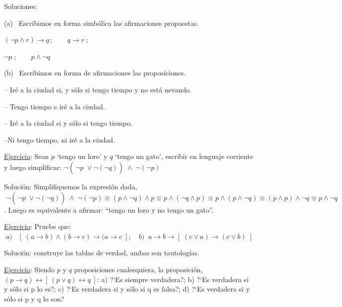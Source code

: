 \textcolor{gris}{ Soluciones:}

\begin{multicols}{2}
\textcolor{gris}{(a)  Escribimos en forma simbólica las afirmaciones propuestas.}

\textcolor{gris}{$ (\neg p \wedge r) \to q \, ; \qquad   q \to  r \; ;$}

\textcolor{gris}{$  \neg p \; ; \qquad     p \wedge \neg q $}

\textcolor{gris}{(b)  Escribimos en forma de afirmaciones las proposiciones.} 

\textcolor{gris}{-- Iré a la ciudad si, y sólo si tengo tiempo y no está nevando.}

\textcolor{gris}{-- Tengo tiempo e iré a la ciudad.}       

\textcolor{gris}{-- Iré a la ciudad si y sólo si tengo tiempo.}       

\textcolor{gris}{--Ni tengo tiempo, ni iré a la ciudad.} 
\end{multicols}

\underline{Ejercicio}:  Sean $p$ `tengo un loro' y $q$ `tengo un gato', escribir en lenguaje corriente y luego simplificar:
$\displaystyle \neg \left( \dfrac {}{} \neg p \; \vee \neg (\neg q) \right) \; \wedge \; \neg (\neg p) $



\textcolor{gris}{Solución:  Simplifiquemos la expresión dada, 
$\; \displaystyle \neg \left( \dfrac {}{} \neg p \; \vee \neg (\neg q) \right) \; \wedge \; \neg (\neg p) \equiv (p \wedge \neg q) \wedge p \equiv p \wedge (\neg q \wedge p ) \equiv p \wedge (p \wedge \neg q) \equiv (p \wedge p) \wedge \neg q \equiv p \wedge \neg q\; $.  
Luego es equivalente a afirmar: ``tengo un loro y no tengo un gato''.} 

\underline{Ejercicio}:  Pruebe que:
$\; a)\; \;  \; \left[ \; (a \to b) \wedge (b \to c) \to (a \to c \; \right]  ; \quad    b)\; \; a \to b \to  \left[ \; (c \vee a) \to (c \vee b) \; \right]   $

\textcolor{gris}{Solución: construye las tablas de verdad, ambas son tautologías.}

\underline{Ejercicio}:   
Siendo $p$ y $q$ proposiciones cualesquiera, la proposición, $(p \to q)  \leftrightarrow \left[ \, (p \vee q) \leftrightarrow q  \; \right] $:  a) ?`Es siempre verdadera?;  \hspace{3mm} b) ?`Es verdadera si y sólo si p lo es?; \hspace{3mm} c) ?`Es verdadera si y sólo si q es falsa?; \hspace{3mm} d) ?`Es verdadera si y sólo si p y q lo son?

